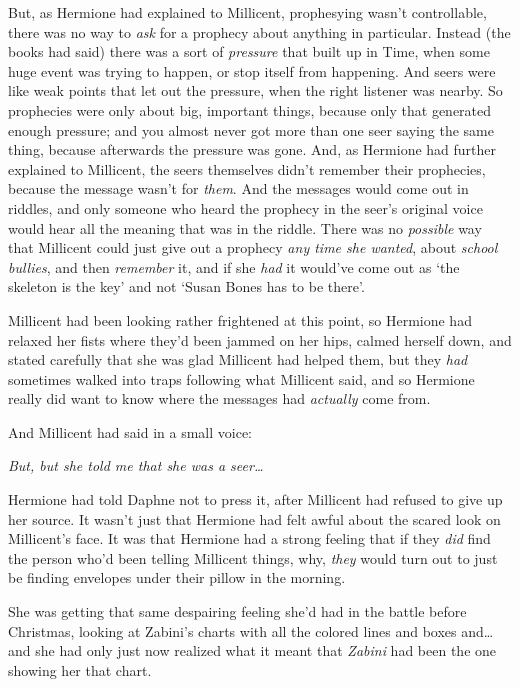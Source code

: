 But, as Hermione had explained to Millicent, prophesying wasn't controllable, there was no way to \emph{ask} for a prophecy about anything in particular. Instead (the books had said) there was a sort of \emph{pressure} that built up in Time, when some huge event was trying to happen, or stop itself from happening. And seers were like weak points that let out the pressure, when the right listener was nearby. So prophecies were only about big, important things, because only that generated enough pressure; and you almost never got more than one seer saying the same thing, because afterwards the pressure was gone. And, as Hermione had further explained to Millicent, the seers themselves didn't remember their prophecies, because the message wasn't for \emph{them}. And the messages would come out in riddles, and only someone who heard the prophecy in the seer's original voice would hear all the meaning that was in the riddle. There was no \emph{possible} way that Millicent could just give out a prophecy \emph{any time she wanted}, about \emph{school bullies}, and then \emph{remember} it, and if she \emph{had} it would've come out as `the skeleton is the key' and not `Susan Bones has to be there'.

Millicent had been looking rather frightened at this point, so Hermione had relaxed her fists where they'd been jammed on her hips, calmed herself down, and stated carefully that she was glad Millicent had helped them, but they \emph{had} sometimes walked into traps following what Millicent said, and so Hermione really did want to know where the messages had \emph{actually} come from.

And Millicent had said in a small voice:

\emph{But, but she told \emph{me} that she was a seer{\ldots}}

Hermione had told Daphne not to press it, after Millicent had refused to give up her source. It wasn't just that Hermione had felt awful about the scared look on Millicent's face. It was that Hermione had a strong feeling that if they \emph{did} find the person who'd been telling Millicent things, why, \emph{they} would turn out to just be finding envelopes under their pillow in the morning.

She was getting that same despairing feeling she'd had in the battle before Christmas, looking at Zabini's charts with all the colored lines and boxes and{\ldots} and she had only just now realized what it meant that \emph{Zabini} had been the one showing her that chart.

